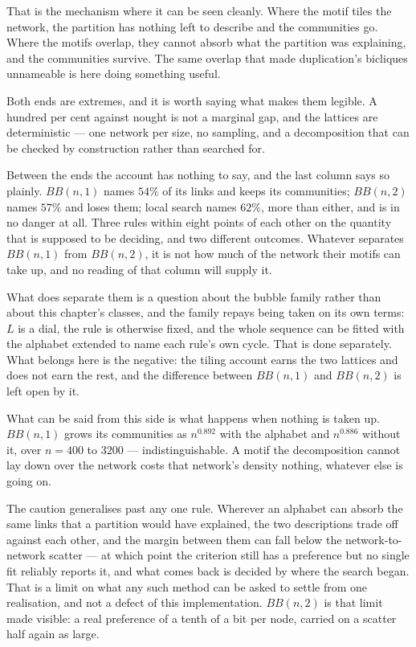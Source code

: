 That is the mechanism where it can be seen cleanly. Where the motif tiles the
network, the partition has nothing left to describe and the communities go. Where
the motifs overlap, they cannot absorb what the partition was explaining, and the
communities survive. The same overlap that made duplication's bicliques
unnameable is here doing something useful.

Both ends are extremes, and it is worth saying what makes them legible. A
hundred per cent against nought is not a marginal gap, and the lattices are
deterministic --- one network per size, no sampling, and a decomposition that can
be checked by construction rather than searched for.

Between the ends the account has nothing to say, and the last column says so
plainly.
$BB(n,1)$ names $54\%$ of its links and keeps its communities; $BB(n,2)$ names
$57\%$ and loses them; local search names $62\%$, more than either, and is in no
danger at all. Three rules within eight points of each other on the quantity that
is supposed to be deciding, and two different outcomes. Whatever separates
$BB(n,1)$ from $BB(n,2)$, it is not how much of the network their motifs can take
up, and no reading of that column will supply it.

What does separate them is a question about the bubble family rather than about
this chapter's classes, and the family repays being taken on its own terms:
$L$ is a dial, the rule is otherwise fixed, and the whole sequence can be fitted
with the alphabet extended to name each rule's own cycle. That is done
separately. What belongs here is the negative: the tiling account earns the two
lattices and does not earn the rest, and the difference between $BB(n,1)$ and
$BB(n,2)$ is left open by it.

What can be said from this side is what happens when nothing is taken up.
$BB(n,1)$ grows its communities as $n^{0.892}$ with the alphabet and $n^{0.886}$
without it, over $n=400$ to $3200$ --- indistinguishable. A motif the
decomposition cannot lay down over the network costs that network's density
nothing, whatever else is going on.

The caution generalises past any one rule. Wherever an alphabet can absorb the
same links that a partition would have explained, the two descriptions trade off
against each other, and the margin between them can fall below the
network-to-network scatter --- at which point the criterion still has a
preference but no single fit reliably reports it, and what comes back is decided
by where the search began. That is a limit on what any such method can be asked
to settle from one realisation, and not a defect of this implementation.
$BB(n,2)$ is that limit made visible: a real preference of a tenth of a bit per
node, carried on a scatter half again as large.

